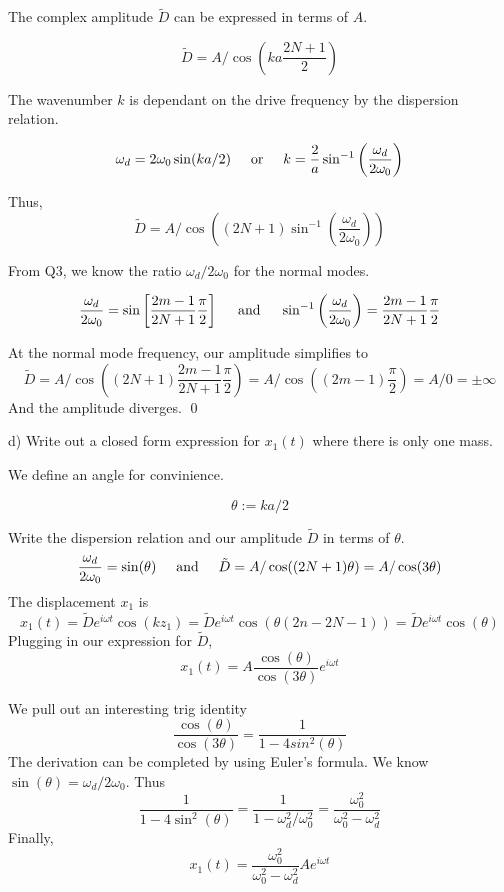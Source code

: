 \documentclass{article}
\newcommand{\textOr}{
    {
        \hspace{5mm}
        \textrm{or}
        \hspace{5mm}
    }
}
\newcommand{\textAnd}{
    {
        \hspace{5mm}
        \textrm{and}
        \hspace{5mm}
    }
}
\newcommand{\Ixp}[1]{
    {
        e^{i{#1}}
    }
}
\begin{document}
The complex amplitude $\tilde{D}$ can be expressed in terms of $A$. 

\[
    \tilde{D} = A / \cos(ka \frac{2N + 1}{2})
\]

The wavenumber $k$ is dependant on the drive frequency by the dispersion 
relation. 

\[
    \omega_d = 2\omega_0 \sin(ka / 2)
    \textOr 
    k = 
    \frac{2}{a}
    \sin^{-1}\left(
        \frac{\omega_d}{2\omega_0}
    \right)
\]

Thus, 
\[
    \tilde{D} = A / \cos\left(
        (2N + 1)\sin^{-1}\left(\frac{\omega_d}{2\omega_0}
        \right)
    \right)
\]

From Q3, we know the ratio $\omega_d / 2\omega_0$ 
for the normal modes. 

\[
    \frac{\omega_d}{2\omega_0} = \sin \left[
        \frac{2m - 1}{2N + 1}
        \frac{\pi}{2}
    \right]
    \textAnd 
    \sin^{-1} \left(
        \frac{\omega_d}{2\omega_0}
    \right)
    = 
    \frac{2m - 1} {2N + 1}\frac{\pi}{2}
\]

At the normal mode frequency, our amplitude simplifies to 
\[
    \tilde{D} = A / \cos\left(
        (2N + 1)
\frac{2m - 1} {2N + 1}\frac{\pi}{2}
    \right)
    = A/\cos\left(
        (2m - 1)\frac{\pi}{2}
    \right) = A/0 = \pm\infty
\]
And the amplitude diverges. \hfill \qed

d) Write out a closed form expression for $x_1(t)$ where there is 
only one mass. 

We define an angle for convinience. 

\[
   \theta := ka/2 
\]

Write the dispersion relation and our amplitude $\tilde{D}$ 
in terms of $\theta$.
\[
    \frac{\omega_d}{2\omega_0} = \sin(\theta)
    \textAnd 
    \tilde{D} = A/\cos((2N+1)\theta) = A/\cos(3\theta)
\]
The displacement $x_1$ is 
\[
    x_1(t) = \tilde{D}\Ixp{\omega t} \cos(k z_1)
    = \tilde{D}\Ixp{\omega t} \cos (\theta (2n - 2N - 1))
    = \tilde{D}\Ixp{\omega t} \cos(\theta)
\]
Plugging in our expression for $\tilde{D}$, 
\[
    x_1(t) = A \frac{\cos(\theta)}{\cos(3\theta)}\Ixp{\omega t}
\]

We pull out an interesting trig identity
\[
    \frac{\cos(\theta)}{\cos(3\theta)}
    = \frac{1}{1- 4sin^2(\theta)}
\]
The derivation can be completed by using Euler's formula. 
We know $\sin(\theta) = \omega_d / 2\omega_0$. Thus 
\[
    \frac{1}{1-4\sin^2(\theta)} = \frac{1}{1-\omega^2_d/\omega^2_0}
    = \frac{\omega^2_0}{\omega^2_0 - \omega^2_d}
\]
Finally, 
\[
    \boxed{
    x_1(t) = 
\frac{\omega^2_0}{\omega^2_0 - \omega^2_d} A \Ixp{\omega t}
    }
\]
\end{document}
